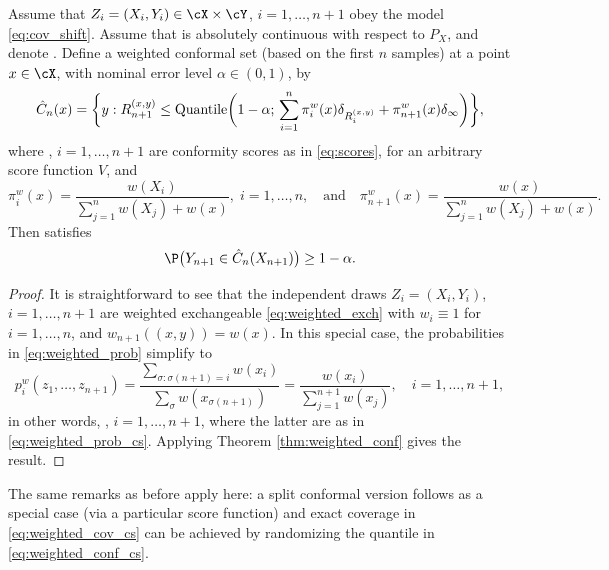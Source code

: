 \documentclass{article}
\begin{document}
\begin{corollary}
\label{cor:weighted_conf_cs}
Assume that $Z_i=(X_i,Y_i) \in \cX \times \cY$, $i=1,\dots,n+1$ obey the model 
\eqref{eq:cov_shift}.  Assume that  is absolutely
continuous with respect to $P_X$, and denote .
Define a weighted conformal set (based on the first $n$ samples) at a point $x
\in \cX$, with nominal error level $\alpha \in (0,1)$, by 
\begin{equation}
\label{eq:weighted_conf_cs}
\hat{C}_n(x) = \bigg\{ y : R_{n+1}^{(x,y)} \leq \mathrm{Quantile}\bigg( 1-\alpha; 
\, \sum_{i=1}^n \pi^w_i(x) \delta_{R_i^{(x,y)}} + \pi^w_{n+1}(x) \delta_\infty 
\bigg) \bigg\}, 
\end{equation}
where , $i=1,\ldots,n+1$ are conformity scores as in
\eqref{eq:scores}, for an arbitrary score function $V$, and
\begin{equation}
\label{eq:weighted_prob_cs}
\pi^w_i(x) = \frac{w(X_i)}{\sum_{j=1}^n w(X_j) + w(x)}, \; i=1,\ldots,n, 
\quad \text{and} \quad 
\pi^w_{n+1}(x) = \frac{w(x)}{\sum_{j=1}^n w(X_j) + w(x)}. 
\end{equation}
Then  satisfies 
\begin{equation}
\label{eq:weighted_cov_cs}
\P\big( Y_{n+1} \in \hC_n(X_{n+1}) \big) \geq 1-\alpha. 
\end{equation}
\end{corollary}

\begin{proof}
It is straightforward to see that the independent draws $Z_i = (X_i,Y_i)$,
$i=1,\ldots,n+1$ are weighted exchangeable \eqref{eq:weighted_exch} with
$w_i\equiv 1$ for $i=1,\ldots,n$, and $w_{n+1}((x,y))=w(x)$. In this special
case, the probabilities in \eqref{eq:weighted_prob} simplify to  
\[
p^w_i(z_1,\ldots,z_{n+1}) = \frac{\sum_{\sigma : \sigma(n+1)=i}
  w(x_i)}{\sum_\sigma w(x_{\sigma(n+1)})} =
\frac{w(x_i)}{\sum_{j=1}^{n+1}w(x_j)}, \quad i=1,\ldots,n+1,
\]
in other words, ,
$i=1,\ldots,n+1$, where the latter are as in \eqref{eq:weighted_prob_cs}. Applying 
Theorem \ref{thm:weighted_conf} gives the result. 
\end{proof}  

The same remarks as before apply here: a split conformal version follows as a
special case (via a particular score function) and exact coverage in
\eqref{eq:weighted_cov_cs} can be achieved by randomizing the quantile in 
\eqref{eq:weighted_conf_cs}.
\end{document}
